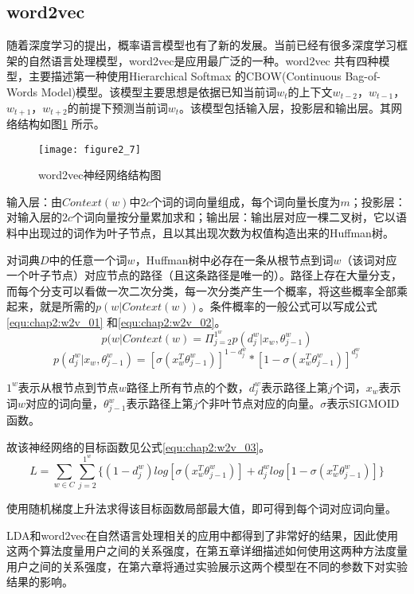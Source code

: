 \subsection{word2vec}
随着深度学习的提出，概率语言模型也有了新的发展。当前已经有很多深度学习框架的自然语言处理模型，word2vec是应用最广泛的一种。word2vec 共有四种模型，主要描述第一种使用Hierarchical Softmax 的CBOW(Continuous Bag-of-Words Model)模型。该模型主要思想是依据已知当前词$w_{t}$的上下文$w_{t-2}$，$w_{t-1}$，$w_{t+1}$，$w_{t+2}$的前提下预测当前词$w_{t}$。该模型包括输入层，投影层和输出层。其网络结构如图\ref{fig:2_7} 所示。
\begin{figure}[htp]
\centering
\texttt{[image: figure2\_7]}
\caption{word2vec神经网络结构图}
\label{fig:2_7}
\end{figure}
\par 输入层：由$Context(w)$中$2c$个词的词向量组成，每个词向量长度为$m$；投影层：对输入层的$2c$个词向量按分量累加求和；输出层：输出层对应一棵二叉树，它以语料中出现过的词作为叶子节点，且以其出现次数为权值构造出来的Huffman树。
\par 对词典$D$中的任意一个词$w$，Huffman树中必存在一条从根节点到词$w$（该词对应一个叶子节点）对应节点的路径（且这条路径是唯一的）。路径上存在大量分支，而每个分支可以看做一次二次分类，每一次分类产生一个概率，将这些概率全部乘起来，就是所需的$p(w|Context(w))$。条件概率的一般公式可以写成公式\ref{equ:chap2:w2v_01} 和\ref{equ:chap2:w2v_02}。
\begin{equation}
\label{equ:chap2:w2v_01}
p(w|Context(w)=\Pi_{j=2}^{1^{w}}p(d_{j}^{w}|x_{w},\theta_{j-1}^{w})
\end{equation}
\begin{equation}
\label{equ:chap2:w2v_02}
p(d_{j}^{w}|x_{w},\theta_{j-1}^{w})=[\sigma(x_{w}^{T}\theta_{j-1}^{w})]^{1-d_{j}^{w}}\ast[1-\sigma(x_{w}^{T}\theta_
{j-1}^{w})]^{d_{j}^{w}}
\end{equation}
\par $1^{w}$表示从根节点到节点$w$路径上所有节点的个数，$d_{j}^{w}$表示路径上第$j$个词，$x_{w}$表示词$w$对应的词向量，$\theta_{j-1}^{w}$表示路径上第$j$个非叶节点对应的向量。$\sigma$表示SIGMOID函数。
\par 故该神经网络的目标函数见公式\ref{equ:chap2:w2v_03}。
\begin{equation}
\label{equ:chap2:w2v_03}
L=\sum_{w\in C}\sum_{j=2}^{1^{w}}\{(1-d_{j}^{w})log[\sigma(x_{w}^{T}\theta_{j-1}^{w})]+d_{j}^{w}log[1-\sigma(x_{w}^{T}\theta_{j-1}^{w})]\}
\end{equation}
\par 使用随机梯度上升法求得该目标函数局部最大值，即可得到每个词对应词向量。
\par LDA和word2vec在自然语言处理相关的应用中都得到了非常好的结果，因此使用这两个算法度量用户之间的关系强度，在第五章详细描述如何使用这两种方法度量用户之间的关系强度，在第六章将通过实验展示这两个模型在不同的参数下对实验结果的影响。
